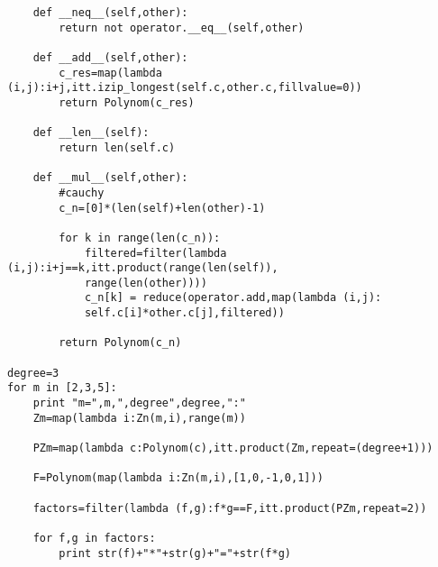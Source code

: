 \documentclass[a4paper,twoside=false,abstract=false,numbers=noenddot,
titlepage=false,headings=small,parskip=half,version=last]{scrartcl}
\theoremstyle{definition}
\theoremstyle{remark}
\begin{document}
\begin{verbatim}
    def __neq__(self,other):
        return not operator.__eq__(self,other)

    def __add__(self,other):
        c_res=map(lambda (i,j):i+j,itt.izip_longest(self.c,other.c,fillvalue=0))
        return Polynom(c_res)
    
    def __len__(self):
        return len(self.c)

    def __mul__(self,other):
        #cauchy
        c_n=[0]*(len(self)+len(other)-1)

        for k in range(len(c_n)): 
            filtered=filter(lambda (i,j):i+j==k,itt.product(range(len(self)),
            range(len(other))))
            c_n[k] = reduce(operator.add,map(lambda (i,j): 
            self.c[i]*other.c[j],filtered))
        
        return Polynom(c_n)

degree=3
for m in [2,3,5]:
    print "m=",m,",degree",degree,":"
    Zm=map(lambda i:Zn(m,i),range(m))

    PZm=map(lambda c:Polynom(c),itt.product(Zm,repeat=(degree+1)))

    F=Polynom(map(lambda i:Zn(m,i),[1,0,-1,0,1])) 

    factors=filter(lambda (f,g):f*g==F,itt.product(PZm,repeat=2))

    for f,g in factors:
        print str(f)+"*"+str(g)+"="+str(f*g)

\end{verbatim}

\end{document}
